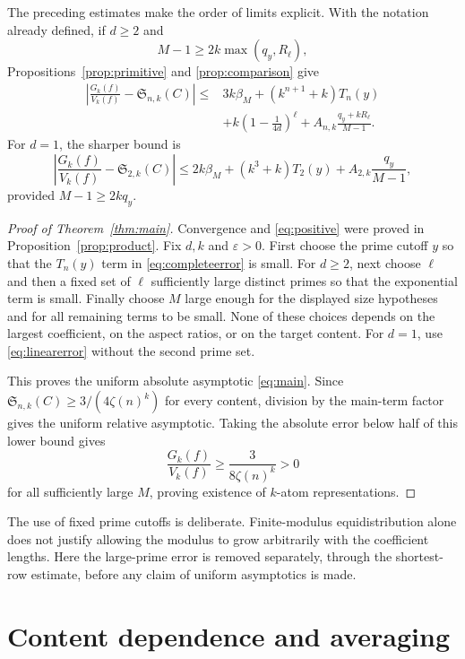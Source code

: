 \documentclass[11pt]{amsart}
\newcommand{\Sseries}{\mathfrak S}
\theoremstyle{definition}
\theoremstyle{remark}
\begin{document}
The preceding estimates make the order of limits explicit. With the
notation already defined, if $d\ge2$ and
\[
M-1\ge2k\max(q_y,R_\ell),
\]
Propositions~\ref{prop:primitive} and \ref{prop:comparison} give
\begin{equation}\label{eq:completeerror}
\begin{aligned}
\left|\frac{G_k(f)}{V_k(f)}-\Sseries_{n,k}(C)\right|
\le{}&3k\beta_M+(k^{n+1}+k)T_n(y)\\
&+k\left(1-\frac1{4d}\right)^\ell
+A_{n,k}\frac{q_y+kR_\ell}{M-1}.
\end{aligned}
\end{equation}
For $d=1$, the sharper bound is
\begin{equation}\label{eq:linearerror}
\left|\frac{G_k(f)}{V_k(f)}-\Sseries_{2,k}(C)\right|
\le2k\beta_M+(k^3+k)T_2(y)
+A_{2,k}\frac{q_y}{M-1},
\end{equation}
provided $M-1\ge2kq_y$.

\begin{proof}[Proof of Theorem~\ref{thm:main}]
Convergence and \eqref{eq:positive} were proved in
Proposition~\ref{prop:product}.
Fix $d,k$ and $\varepsilon>0$. First choose the prime cutoff $y$ so
that the $T_n(y)$ term in \eqref{eq:completeerror} is small. For
$d\ge2$, next choose $\ell$ and then a fixed set of $\ell$ sufficiently
large distinct primes so that the exponential term is small.
Finally choose $M$ large enough for the displayed size hypotheses and
for all remaining terms to be small. None of these choices depends
on the largest coefficient, on the aspect ratios, or on the target
content. For $d=1$, use \eqref{eq:linearerror} without the second
prime set.

This proves the uniform absolute asymptotic \eqref{eq:main}. Since
$\Sseries_{n,k}(C)\ge3/(4\zeta(n)^k)$ for every content, division by
the main-term factor gives the uniform relative asymptotic. Taking
the absolute error below half of this lower bound gives
\[
\frac{G_k(f)}{V_k(f)}\ge\frac{3}{8\zeta(n)^k}>0
\]
for all sufficiently large $M$, proving existence of $k$-atom
representations.
\end{proof}

The use of fixed prime cutoffs is deliberate. Finite-modulus
equidistribution alone does not justify allowing the modulus to grow
arbitrarily with the coefficient lengths. Here the large-prime error
is removed separately, through the shortest-row estimate, before any
claim of uniform asymptotics is made.

\section{Content dependence and averaging}\label{sec:consequences}
\end{document}
